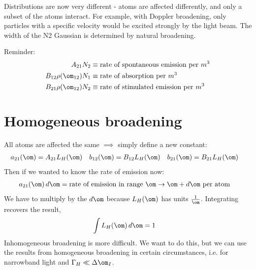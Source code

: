 \documentclass[a4paper, 11pt, normalem]{report}
\begin{document}
\begin{example}
\begin{enumerate}
\begin{figure}[H]
        \end{figure}
        Distributions are now very different - atoms are affected differently, and only a subset of the atoms interact.
        For example, with Doppler broadening, only particles with a specific velocity would be excited strongly by the light beam. 
        The width of the N2 Gaussian is determined by natural broadening. 
\end{enumerate}
\end{example}
Reminder:
\begin{align}
    A_{21}N_2 &\equiv \text{rate of spontaneous emission per }m^3 \\
    B_{12}\rho(\om_{12})N_1 &\equiv \text{rate of absorption per }m^3 \\
    B_{21}\rho(\om_{12})N_2 &\equiv \text{rate of stimulated emission per }m^3
\end{align}
\section{Homogeneous broadening}
All atoms are affected the same $\implies$ simply define a new constant:
\begin{align}
    a_{21}(\om) &= A_{21}L_H(\om) & b_{12}(\om) &= B_{12}L_H(\om) & b_{21}(\om) &= B_{21}L_H(\om)
\end{align}
Then if we wanted to know the rate of emission now:
\begin{align}
    a_{21}(\om)\,d\om &= \text{rate of emission in range $\om\to\om+d\om$ per atom} 
\end{align}
We have to multiply by the $d\om$ because $L_H(\om)$ has units $\frac{1}{\om}$.
Integrating recovers the result,
\begin{align}
    \int L_H(\om)\,d\om &= 1
\end{align}
Inhomogeneous broadening is more difficult. 
We want to do this, but we can use the results from homogeneous broadening in certain circumstances, i.e. for narrowband light and $\Gamma_H \ll \Delta\om_I$.
\end{document}

